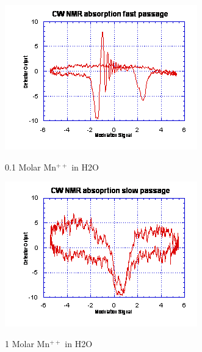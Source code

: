 \documentclass{../lab}
\begin{document}
\begin{enumerate}
    \begin{figure}[h]
    \begin{minipage}[t]{0.33\textwidth}
        \href{http://experimentationlab.berkeley.edu/sites/default/files/images/NMR21.gif}{\includegraphics[width=0.95\linewidth,keepaspectratio]{images/NMR21.png}}
        \caption{0.1 Molar Mn$^{++}$ in H2O}
        \label{fig:TenthMolarMn}
    \end{minipage}\hfill
    \begin{minipage}[t]{0.31\textwidth}
        \href{http://experimentationlab.berkeley.edu/sites/default/files/images/NMR22.gif}{\includegraphics[width=\linewidth,keepaspectratio]{images/NMR22.png}}
        \caption{1 Molar Mn$^{++}$ in H2O}
    \end{minipage}\hfill

\end{figure}
\end{enumerate}
\end{document}
